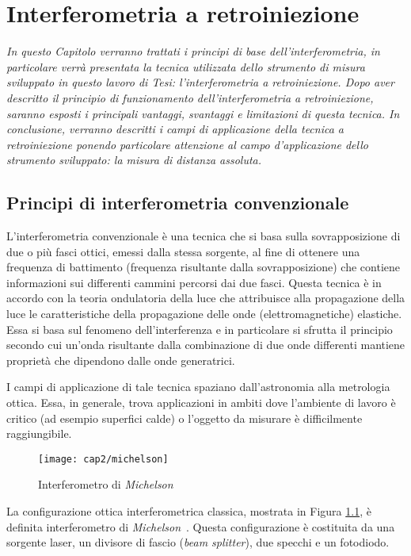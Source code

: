 \chapter{Interferometria a retroiniezione}
\label{capitolo2}
\thispagestyle{empty}

\textit{In questo Capitolo verranno trattati i principi di base dell'interferometria, in particolare verrà presentata la tecnica utilizzata dello strumento di misura sviluppato in questo lavoro di Tesi: l'interferometria a retroiniezione. Dopo aver descritto il principio di funzionamento dell'interferometria a retroiniezione, saranno esposti i principali vantaggi, svantaggi e limitazioni di questa tecnica. In conclusione, verranno descritti i campi di applicazione della tecnica a retroiniezione ponendo particolare attenzione al campo d'applicazione dello strumento sviluppato: la misura di distanza assoluta.}

\section{Principi di interferometria convenzionale}
L'interferometria convenzionale è una tecnica che si basa sulla sovrapposizione di due o più fasci ottici, emessi dalla stessa sorgente, al fine di ottenere una frequenza di battimento (frequenza risultante dalla sovrapposizione) che contiene informazioni sui differenti cammini percorsi dai due fasci. Questa tecnica è in accordo con la teoria ondulatoria della luce che attribuisce alla propagazione della luce le caratteristiche della propagazione delle onde (elettromagnetiche) elastiche. Essa si basa sul fenomeno dell'interferenza e in particolare si sfrutta il principio secondo cui un'onda risultante dalla combinazione di due onde differenti mantiene proprietà che dipendono dalle onde generatrici.

I campi di applicazione di tale tecnica spaziano dall'astronomia alla metrologia ottica. Essa, in generale, trova applicazioni in ambiti dove l'ambiente di lavoro è critico (ad esempio superfici calde) o l'oggetto da misurare è difficilmente raggiungibile.
\begin{figure}  
  \begin{center}
    \texttt{[image: cap2/michelson]}
    \caption{Interferometro di \textit{Michelson}}
    \label{michelson}
  \end{center}
\end{figure}
La configurazione ottica interferometrica classica, mostrata in Figura \ref{michelson}, è definita interferometro di \textit{Michelson}~\cite{sensmeslaser}. Questa configurazione è costituita da una sorgente laser, un divisore di fascio (\textit{beam splitter}), due specchi e un fotodiodo.

